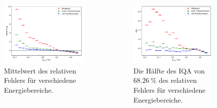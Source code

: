 \documentclass[aspectratio=1610, professionalfonts, 9pt]{beamer}
\begin{document}
  \begin{frame}
    \begin{columns}
      \begin{figure}
        \includegraphics[width=\textwidth]{pictures/trafo_nested_bias.pdf}
        \caption{Mittelwert des relativen Fehlers für verschiedene Energiebereiche.}
        \label{}
      \end{figure}
      \begin{figure}
        \includegraphics[width=\textwidth]{pictures/trafo_nested_resolution.pdf}
        \caption{Die Hälfte des IQA von $\SI{68,26}{\percent}$ des relativen Fehlers für verschiedene Energiebereiche.}
        \label{}
      \end{figure}
    \end{columns}
  \end{frame}
\end{document}

